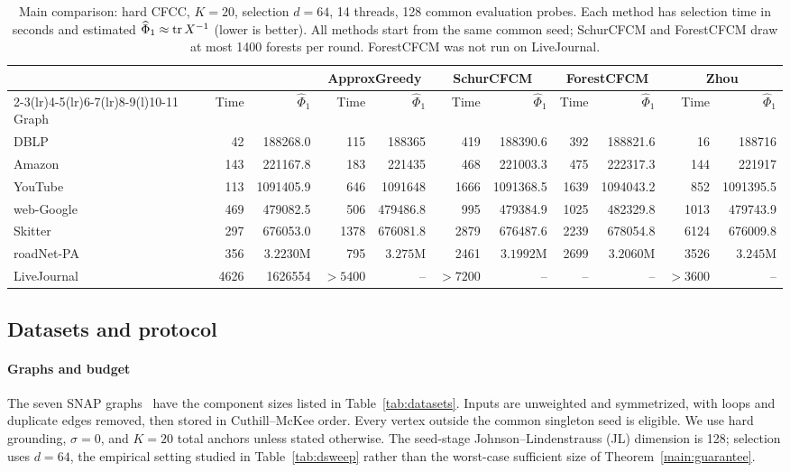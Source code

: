 \begin{table}[t]
\centering\footnotesize
\caption{Main comparison: hard CFCC, $K=20$, selection $d=64$,
14 threads, 128 common evaluation probes. Each method has selection
time in seconds and estimated $\widehat\Phi_1\approx\operatorname{tr} X^{-1}$
(lower is better). All methods start from the same common seed;
SchurCFCM and ForestCFCM draw at most 1400 forests per round.
ForestCFCM was not run on LiveJournal.}
\label{tab:main}
\setlength{\tabcolsep}{3.6pt}
\begin{tabular}{@{}lrrrrrrrrrr@{}}\toprule
& \multicolumn{2}{c}{\alg{}}
& \multicolumn{2}{c}{ApproxGreedy}
& \multicolumn{2}{c}{SchurCFCM}
& \multicolumn{2}{c}{ForestCFCM}
& \multicolumn{2}{c}{Zhou}\\
\cmidrule(lr){2-3}\cmidrule(lr){4-5}\cmidrule(lr){6-7}\cmidrule(lr){8-9}\cmidrule(l){10-11}
Graph & Time & $\widehat\Phi_1$ & Time & $\widehat\Phi_1$ & Time & $\widehat\Phi_1$ & Time & $\widehat\Phi_1$ & Time & $\widehat\Phi_1$\\\midrule
DBLP & 42 & 188268.0 & 115 & 188365 & 419 & 188390.6 & 392 & 188821.6 & 16 & 188716\\
Amazon & 143 & 221167.8 & 183 & 221435 & 468 & 221003.3 & 475 & 222317.3 & 144 & 221917\\
YouTube & 113 & 1091405.9 & 646 & 1091648 & 1666 & 1091368.5 & 1639 & 1094043.2 & 852 & 1091395.5\\
web-Google & 469 & 479082.5 & 506 & 479486.8 & 995 & 479384.9 & 1025 & 482329.8 & 1013 & 479743.9\\
Skitter & 297 & 676053.0 & 1378 & 676081.8 & 2879 & 676487.6 & 2239 & 678054.8 & 6124 & 676009.8\\
roadNet-PA & 356 & $3.2230\mathrm M$ & 795 & $3.275\mathrm M$ & 2461 & $3.1992\mathrm M$ & 2699 & $3.2060\mathrm M$ & 3526 & $3.245\mathrm M$\\
LiveJournal & 4626 & 1626554 & $>5400$ & -- & $>7200$ & -- & -- & -- & $>3600$ & --\\
\bottomrule\end{tabular}
\end{table}

\subsection{Datasets and protocol}
\paragraph{Graphs and budget}
The seven SNAP graphs~\cite{snap2014} have the component sizes
listed in Table~\ref{tab:datasets}. Inputs are unweighted
and symmetrized, with loops and duplicate edges removed, then stored
in Cuthill--McKee order. Every vertex outside the common singleton
seed is eligible. We use hard grounding, $\sigma=0$, and $K=20$
total anchors unless stated otherwise. The seed-stage
Johnson--Lindenstrauss (JL) dimension is 128; selection uses $d=64$, the empirical setting studied in
Table~\ref{tab:dsweep} rather than the worst-case sufficient size
of Theorem~\ref{main:guarantee}.

